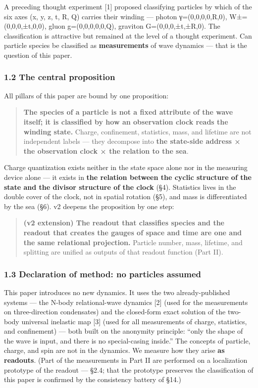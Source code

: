 \documentclass[
]{article}
\begin{document}
A preceding thought experiment {[}1{]} proposed classifying particles by
which of the six axes (x, y, z, t, R, Q) carries their winding ---
photon γ=(0,0,0,0,R,0), W±=(0,0,0,±t,0,0), gluon g=(0,0,0,0,0,Q),
graviton G=(0,0,0,±t,±R,0). The classification is attractive but
remained at the level of a thought experiment. Can particle species be
classified as \textbf{measurements} of wave dynamics --- that is the
question of this paper.

\subsubsection{1.2 The central
proposition}\label{the-central-proposition}

All pillars of this paper are bound by one proposition:

\begin{quote}
\textbf{The species of a particle is not a fixed attribute of the wave
itself; it is classified by how an observation clock reads the winding
state.} Charge, confinement, statistics, mass, and lifetime are not
independent labels --- they decompose into \textbf{the state-side
address × the observation clock × the relation to the sea}.
\end{quote}

Charge quantization exists neither in the state space alone nor in the
measuring device alone --- it exists in \textbf{the relation between the
cyclic structure of the state and the divisor structure of the clock}
(§4). Statistics lives in the double cover of the clock, not in spatial
rotation (§5), and mass is differentiated by the sea (§6). v2 deepens
the proposition by one step:

\begin{quote}
\textbf{(v2 extension) The readout that classifies species and the
readout that creates the gauges of space and time are one and the same
relational projection.} Particle number, mass, lifetime, and splitting
are unified as outputs of that readout function (Part II).
\end{quote}

\subsubsection{1.3 Declaration of method: no particles
assumed}\label{declaration-of-method-no-particles-assumed}

This paper introduces no new dynamics. It uses the two already-published
systems --- the N-body relational-wave dynamics {[}2{]} (used for the
measurements on three-direction condensates) and the closed-form exact
solution of the two-body universal inelastic map {[}3{]} (used for all
measurements of charge, statistics, and confinement) --- both built on
the anonymity principle: ``only the shape of the wave is input, and
there is no special-casing inside.'' The concepts of particle, charge,
and spin are not in the dynamics. We measure how they arise \textbf{as
readouts}. (Part of the measurements in Part II are performed on a
localization prototype of the readout --- §2.4; that the prototype
preserves the classification of this paper is confirmed by the
consistency battery of §14.)
\end{document}
